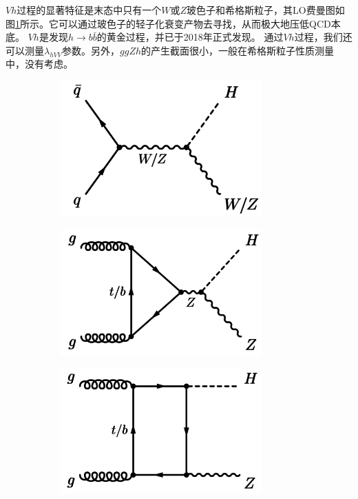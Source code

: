 $Vh$过程的显著特征是末态中只有一个$W$或$Z$玻色子和希格斯粒子，其LO费曼图如图\ref{fig:diagram_VH}所示。它可以通过玻色子的轻子化衰变产物去寻找，从而极大地压低QCD本底。
$Vh$是发现$h\rightarrow b\bar{b}$的黄金过程，并已于2018年正式发现\cite{Aaboud:2018zhk,Sirunyan:2018kst}。
通过$Vh$过程，我们还可以测量$\lambda_{hVV}$参数。另外，$ggZh$的产生截面很小，一般在希格斯粒子性质测量中，没有考虑。
\begin{figure}[h]
\centering
 \begin{subfigure}[b]{0.33\textwidth}
  \includegraphics[width=0.85\textwidth]{fig/diagram_VH.png}
  \caption{}
  \label{fig:diagram_VH}
 \end{subfigure}
 \begin{subfigure}[b]{0.33\textwidth}
  \includegraphics[width=0.85\textwidth]{fig/diagram_ggZh1.png}
  \caption{}
  \label{fig:diagram_ggzh1}
 \end{subfigure}
 \begin{subfigure}[b]{0.33\textwidth}
  \includegraphics[width=0.85\textwidth]{fig/diagram_ggZh2.png}

\end{subfigure}
\end{figure}

